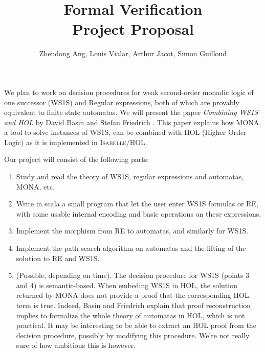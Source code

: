 \documentclass[12pt,a4paper]{article}
\begin{document}
\title{Formal Verification \\ Project Proposal}
\author{Zhendong Ang, Louis Vialar, Arthur Jacot, Simon Guilloud}
\maketitle
We plan to work on decision procedures for weak second-order monadic logic of one successor (WS1S) and Regular expressions, both of which are provably equivalent to finite state automatas. We will present the paper \textit{Combining WS1S and HOL} by David Basin and Stefan Friedrich \cite{basin_combining_2001}. This paper explains how MONA, a tool to solve instances of WS1S, can be combined with HOL (Higher Order Logic) as it is implemented in I\textsc{sabelle}/HOL.

Our project will consist of the following parts:
\begin{enumerate}
\item Study and read the theory of WS1S, regular expressions and automatas, MONA, etc.

\item Write in scala a small program that let the user enter WS1S formulas or RE, with some usable internal encoding and basic operations on these expressions.

\item Implement the morphism from RE to automatas, and similarly for WS1S.

\item Implement the path search algorithm on automatas and the lifting of the solution to RE and WS1S.

\item (Possible, depending on time). The decision procedure for WS1S (points 3 and 4) is semantic-based. When embeding WS1S in HOL, the solution returned by MONA does not provide a proof that the corresponding HOL term is true. Indeed, Basin and Friedrich explain that proof reconstruction implies to formalize the whole theory of automatas in HOL, which is not practical. It may be interesting to be able to extract an HOL proof from the decision procedure, possibly by modifying this procedure. We're not really sure of how ambitious this is however.
\end{enumerate}


\end{document}

